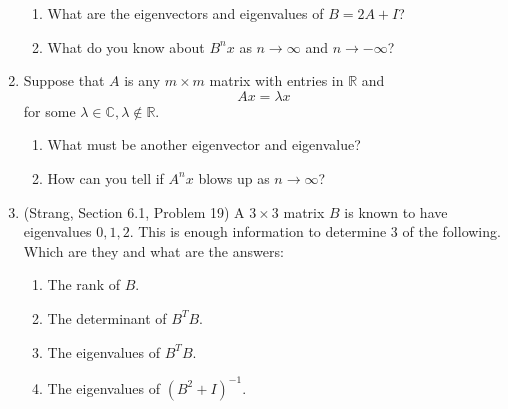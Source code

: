 \documentclass[11pt]{article}
\newcommand{\cc}{\mathbb{C}}
\newcommand{\rr}{\mathbb{R}}
\begin{document}
\begin{enumerate}
\begin{enumerate}
\item What are the eigenvectors and eigenvalues of $B = 2A + I$?

\item What do you know about $B^nx$ as $n \to \infty$ and $n \to -\infty$?

\end{enumerate}

\item Suppose that $A$ is any $m \times m$ matrix with entries in $\rr$ and 
\[Ax = \lambda x \]
for some $\lambda \in \cc, \lambda \not\in \rr$. 
\begin{enumerate}
\item What must be another eigenvector and eigenvalue?
\item How can you tell if $A^n x$ blows up as $n \to \infty$?
\end{enumerate}


\item (Strang, Section 6.1, Problem 19) A $3 \times 3$ matrix $B$ is known to have eigenvalues $0,1,2$.  This is enough information to determine $3$ of the following.  Which are they and what are the answers:
\begin{enumerate}
\item The rank of $B$.
\item The determinant of $B^TB$.
\item The eigenvalues of $B^TB$.
\item The eigenvalues of $(B^2 + I)^{-1}$.
\end{enumerate}

\end{enumerate}
\end{document}

